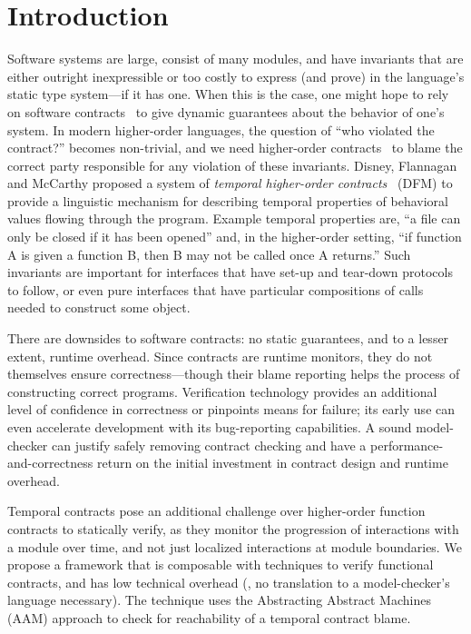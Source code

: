 
\section{Introduction}\label{sec:intro}

Software systems are large, consist of many modules, and have invariants that are either outright inexpressible or too costly to express (and prove) in the language's static type system---if it has one.
%
When this is the case, one might hope to rely on software contracts~\cite{dvanhorn:meyer-eiffel} to give dynamic guarantees about the behavior of one's system.
%
In modern higher-order languages, the question of ``who violated the contract?'' becomes non-trivial, and we need higher-order contracts~\citep{dvanhorn:Findler2002Contracts} to blame the correct party responsible for any violation of these invariants.
%
Disney, Flannagan and McCarthy proposed a system of \emph{temporal higher-order contracts}~\citep{ianjohnson:DBLP:conf/icfp/DisneyFM11} (DFM) to provide a linguistic mechanism for describing temporal properties of behavioral values flowing through the program.
%
%
Example temporal properties are, ``a file can only be closed if it has been opened'' and, in the higher-order setting, ``if function A is given a function B, then B may not be called once A returns.''
%
Such invariants are important for interfaces that have set-up and tear-down protocols to follow, or even pure interfaces that have particular compositions of calls needed to construct some object.

There are downsides to software contracts: no static guarantees, and to a lesser extent, runtime overhead.
%
Since contracts are runtime monitors, they do not themselves ensure correctness---though their blame reporting helps the process of constructing correct programs.
%
Verification technology provides an additional level of confidence in correctness or pinpoints means for failure; its early use can even accelerate development with its bug-reporting capabilities.
%
A sound model-checker can justify safely removing contract checking and have a performance-and-correctness return on the initial investment in contract design and runtime overhead.

Temporal contracts pose an additional challenge over higher-order function contracts to statically verify, as they monitor the progression of interactions with a module over time, and not just localized interactions at module boundaries.
%
We propose a framework that is composable with techniques to verify functional contracts, and has low technical overhead (\eg, no translation to a model-checker's language necessary).
%
The technique uses the Abstracting Abstract Machines (AAM) approach \citep{dvanhorn:VanHorn2010Abstracting} to check for reachability of a temporal contract blame.

